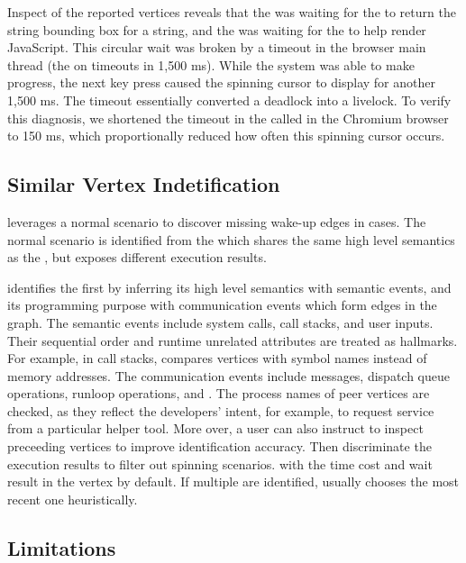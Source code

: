 Inspect of the reported vertices reveals that the  was waiting
for the  to return the string bounding box for a string, and the
 was waiting for the  to help render JavaScript.
This circular wait was broken by a timeout in the browser main thread (the
 on  timeouts in 1,500 ms). While the system
was able to make progress, the next key press caused the spinning cursor to
display for another 1,500 ms. The timeout essentially converted a deadlock
into a livelock. To verify this diagnosis, we shortened the timeout in the
 called in the Chromium browser to 150 ms, which
proportionally reduced how often this spinning cursor occurs.

\subsection{Similar Vertex Indetification}\label{subsec:similarvertex}

\xxx leverages a normal scenario to discover missing wake-up edges in 
cases. The normal scenario is identified from the \similarnode which shares
the same high level semantics as the \spinningnode, but exposes different
execution results.

\xxx identifies the \similarnodes first by inferring its high level semantics
with semantic events, and its programming purpose with communication events
which form edges in the graph. The semantic events include system calls, call
stacks, and user inputs. Their sequential order and runtime unrelated attributes
are treated as hallmarks. For example, in call stacks, \xxx compares vertices
with symbol names instead of memory addresses. The communication events include
messages, dispatch queue operations, runloop operations, \dataflagread and
\dataflagwrite. The process names of peer vertices are checked, as they reflect
the developers' intent, for example, to request service from a particular
helper tool. More over, a user can also instruct \xxx to inspect preceeding
vertices to improve identification accuracy. Then \xxx discriminate the
execution results to filter out spinning scenarios.  with the time cost and
wait result in the vertex by default. If multiple \similarnodes are identified,
\xxx usually chooses the most recent one heuristically.

\subsection{Limitations}

